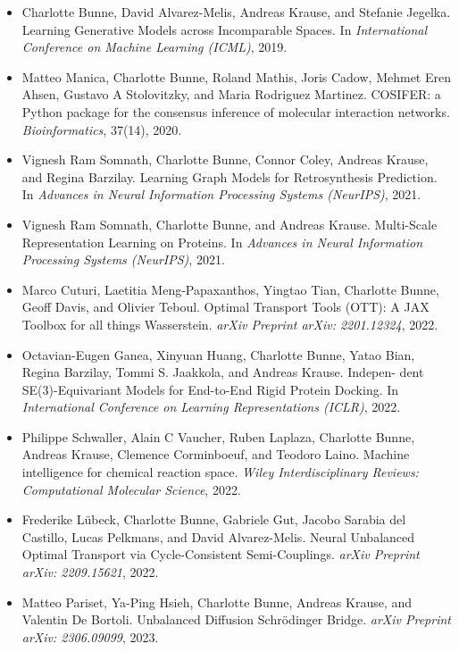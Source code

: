 \begin{itemize}
	\item[] Charlotte Bunne, David Alvarez-Melis, Andreas Krause, and Stefanie Jegelka. Learning Generative Models across Incomparable Spaces. In \textit{International Conference on Machine Learning (ICML)}, 2019.
	\item[] Matteo Manica, Charlotte Bunne, Roland Mathis, Joris Cadow, Mehmet Eren Ahsen, Gustavo A Stolovitzky, and Maria Rodriguez Martinez. COSIFER: a Python package for the consensus inference of molecular interaction networks. \textit{Bioinformatics}, 37(14), 2020.
	\item[] Vignesh Ram Somnath, Charlotte Bunne, Connor Coley, Andreas Krause, and Regina Barzilay. Learning Graph Models for Retrosynthesis Prediction. In \textit{Advances in Neural Information Processing Systems (NeurIPS)}, 2021.
	\item[] Vignesh Ram Somnath, Charlotte Bunne, and Andreas Krause. Multi-Scale Representation Learning on Proteins. In \textit{Advances in Neural Information Processing Systems (NeurIPS)}, 2021.
	\item[] Marco Cuturi, Laetitia Meng-Papaxanthos, Yingtao Tian, Charlotte Bunne, Geoff Davis, and Olivier Teboul. Optimal Transport Tools (OTT): A JAX Toolbox for all things Wasserstein. \textit{arXiv Preprint arXiv: 2201.12324}, 2022.
	\item[] Octavian-Eugen Ganea, Xinyuan Huang, Charlotte Bunne, Yatao Bian, Regina Barzilay, Tommi S. Jaakkola, and Andreas Krause. Indepen- dent SE(3)-Equivariant Models for End-to-End Rigid Protein Docking. In \textit{International Conference on Learning Representations (ICLR)}, 2022.
	\item[] Philippe Schwaller, Alain C Vaucher, Ruben Laplaza, Charlotte Bunne, Andreas Krause, Clemence Corminboeuf, and Teodoro Laino. Machine intelligence for chemical reaction space. \textit{Wiley Interdisciplinary Reviews: Computational Molecular Science}, 2022.
	\item[] Frederike L\"ubeck, Charlotte Bunne, Gabriele Gut, Jacobo Sarabia del Castillo, Lucas Pelkmans, and David Alvarez-Melis. Neural Unbalanced Optimal Transport via Cycle-Consistent Semi-Couplings. \textit{arXiv Preprint arXiv: 2209.15621}, 2022.
	\item[] Matteo Pariset, Ya-Ping Hsieh, Charlotte Bunne, Andreas Krause, and Valentin De Bortoli. Unbalanced Diffusion Schr{\"o}dinger Bridge. \textit{arXiv Preprint arXiv: 2306.09099}, 2023.
\end{itemize}


